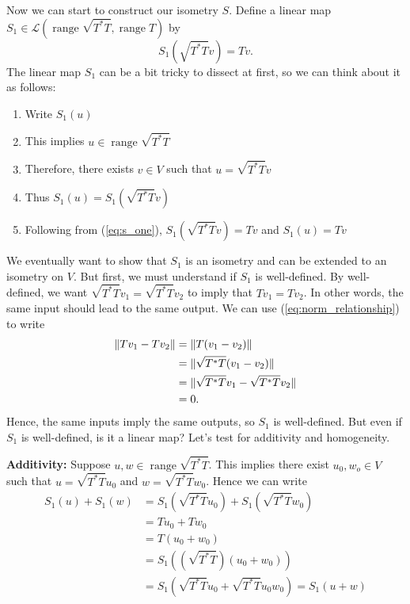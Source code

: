 \documentclass{article}
\begin{document}
Now we can start to construct our isometry $S$. Define a linear map $S_1\in\mathcal{L}(\operatorname{range}\sqrt{T^*T},\operatorname{range}T)$ by
\begin{equation}\label{eq:s_one}
    S_1(\sqrt{T^*T}v)=Tv.
\end{equation}
The linear map $S_1$ can be a bit tricky to dissect at first, so we can think about it as follows:
\begin{enumerate}
    \item Write $S_1(u)$
    \item This implies $u\in\operatorname{range}\sqrt{T^*T}$
    \item Therefore, there exists $v\in V$ such that $u = \sqrt{T^*T}v$
    \item Thus $S_1(u)=S_1(\sqrt{T^*T}v)$
    \item Following from (\ref{eq:s_one}), $S_1(\sqrt{T^*T}v)=Tv$ and $S_1(u)=Tv$
\end{enumerate}
We eventually want to show that $S_1$ is an isometry and can be extended to an isometry on $V$. But first, we must understand if $S_1$ is well-defined. By well-defined, we want $\sqrt{T^*T}v_1=\sqrt{T^*T}v_2$ to imply that $Tv_1=Tv_2$. In other words, the same input should lead to the same output. We can use (\ref{eq:norm_relationship}) to write
\begin{align*}
    \lVert Tv_1-Tv_2\rVert&=\lVert T(v_1-v_2)\rVert\\
    &=\lVert\sqrt{T^*T}(v_1-v_2)\rVert \\
    &=\lVert\sqrt{T^*T}v_1-\sqrt{T^*T}v_2\rVert\\
    &=0.
\end{align*}
Hence, the same inputs imply the same outputs, so $S_1$ is well-defined. But even if $S_1$ is well-defined, is it a linear map? Let's test for additivity and homogeneity.

\textbf{Additivity:} Suppose $u,w\in\operatorname{range}\sqrt{T^*T}$. This implies there exist $u_0,w_o\in V$ such that $u=\sqrt{T^*T}u_0$ and $w=\sqrt{T^*T}w_0$. Hence we can write
\begin{align*}
    S_1(u)+S_1(w)&=S_1(\sqrt{T^*T}u_0) + S_1(\sqrt{T^*T}w_0)\\
    &= Tu_0+Tw_0 \\
    &= T(u_0+w_0) \\
    &= S_1((\sqrt{T^*T})(u_0+w_0))\\
    &=S_1(\sqrt{T^*T}u_0+\sqrt{T^*T}u_0w_0)=S_1(u+w)
\end{align*}
\end{document}
